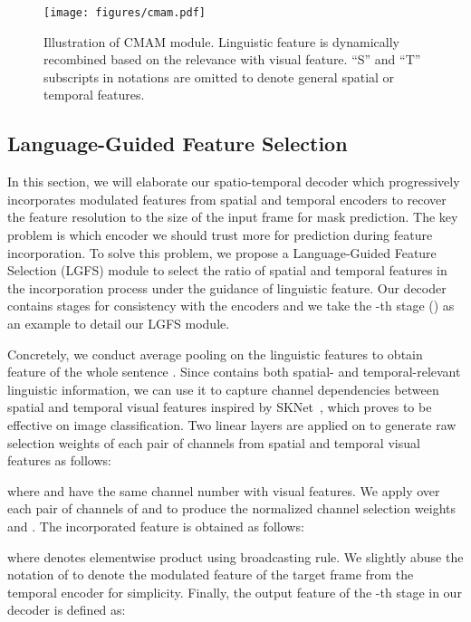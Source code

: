 \documentclass[final]{cvpr}
\begin{document}
\begin{figure}[!htbp]
   \begin{center}
      \texttt{[image: figures/cmam.pdf]}
   \end{center}
      \caption{Illustration of CMAM module. 
      Linguistic feature is dynamically recombined based on the relevance with visual feature. 
      ``S'' and ``T'' subscripts in notations are omitted to denote general spatial or temporal features.}
   \label{fig:cmam}
\end{figure}

\subsection{Language-Guided Feature Selection}
In this section, we will elaborate our spatio-temporal decoder which progressively incorporates modulated features from spatial and temporal encoders to recover the feature resolution to the size of the input frame for mask prediction. 
The key problem is which encoder we should trust more for prediction during feature incorporation. 
To solve this problem, we propose a Language-Guided Feature Selection (LGFS) module to select the ratio of spatial and temporal features in the incorporation process under the guidance of linguistic feature. 
Our decoder contains  stages for consistency with the encoders and we take the -th stage () as an example to detail our LGFS module. 

Concretely, we conduct average pooling on the linguistic features  to obtain feature of the whole sentence . 
Since  contains both spatial- and temporal-relevant linguistic information, we can use it to capture channel dependencies between spatial and temporal visual features inspired by SKNet~\cite{li2019selective}, which proves to be effective on image classification. 
Two linear layers are applied on  to generate raw selection weights of each pair of channels from spatial and temporal visual features as follows:

where  and  have the same channel number with visual features. 
We apply  over each pair of channels of  and  to produce the normalized channel selection weights  and . 
The incorporated feature  is obtained as follows:

where  denotes elementwise product using broadcasting rule. We slightly abuse the notation of  to denote the modulated feature of the target frame from the temporal encoder for simplicity. 
Finally, the output feature of the -th stage in our decoder  is defined as:
\end{document}
